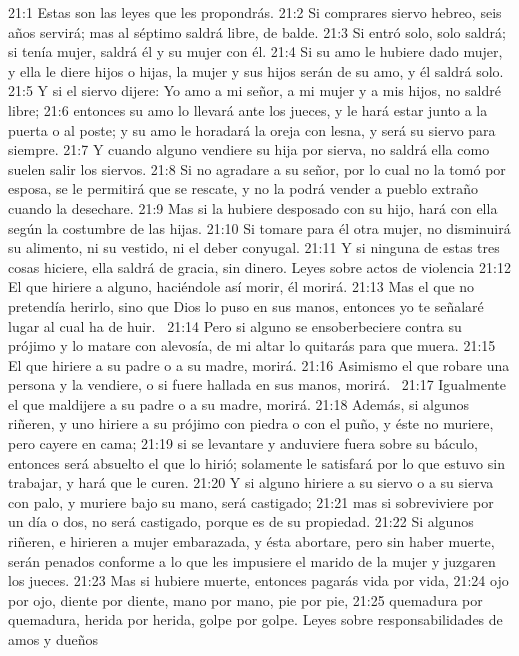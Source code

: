 21:1 Estas son las leyes que les propondrás. 
21:2 Si comprares siervo hebreo, seis años servirá; mas al séptimo saldrá libre, de balde. 
21:3 Si entró solo, solo saldrá; si tenía mujer, saldrá él y su mujer con él. 
21:4 Si su amo le hubiere dado mujer, y ella le diere hijos o hijas, la mujer y sus hijos serán de su amo, y él saldrá solo. 
21:5 Y si el siervo dijere: Yo amo a mi señor, a mi mujer y a mis hijos, no saldré libre; 
21:6 entonces su amo lo llevará ante los jueces, y le hará estar junto a la puerta o al poste; y su amo le horadará la oreja con lesna, y será su siervo para siempre. 
21:7 Y cuando alguno vendiere su hija por sierva, no saldrá ella como suelen salir los siervos. 
21:8 Si no agradare a su señor, por lo cual no la tomó por esposa, se le permitirá que se rescate, y no la podrá vender a pueblo extraño cuando la desechare. 
21:9 Mas si la hubiere desposado con su hijo, hará con ella según la costumbre de las hijas. 
21:10 Si tomare para él otra mujer, no disminuirá su alimento, ni su vestido, ni el deber conyugal. 
21:11 Y si ninguna de estas tres cosas hiciere, ella saldrá de gracia, sin dinero. 
Leyes sobre actos de violencia 
21:12 El que hiriere a alguno, haciéndole así morir, él morirá. 
21:13 Mas el que no pretendía herirlo, sino que Dios lo puso en sus manos, entonces yo te señalaré lugar al cual ha de huir.  
21:14 Pero si alguno se ensoberbeciere contra su prójimo y lo matare con alevosía, de mi altar lo quitarás para que muera. 
21:15 El que hiriere a su padre o a su madre, morirá. 
21:16 Asimismo el que robare una persona y la vendiere, o si fuere hallada en sus manos, morirá.  
21:17 Igualmente el que maldijere a su padre o a su madre, morirá. 
21:18 Además, si algunos riñeren, y uno hiriere a su prójimo con piedra o con el puño, y éste no muriere, pero cayere en cama; 
21:19 si se levantare y anduviere fuera sobre su báculo, entonces será absuelto el que lo hirió; solamente le satisfará por lo que estuvo sin trabajar, y hará que le curen. 
21:20 Y si alguno hiriere a su siervo o a su sierva con palo, y muriere bajo su mano, será castigado; 
21:21 mas si sobreviviere por un día o dos, no será castigado, porque es de su propiedad. 
21:22 Si algunos riñeren, e hirieren a mujer embarazada, y ésta abortare, pero sin haber muerte, serán penados conforme a lo que les impusiere el marido de la mujer y juzgaren los jueces. 
21:23 Mas si hubiere muerte, entonces pagarás vida por vida, 
21:24 ojo por ojo, diente por diente, mano por mano, pie por pie, 
21:25 quemadura por quemadura, herida por herida, golpe por golpe. 
Leyes sobre responsabilidades de amos y dueños 
